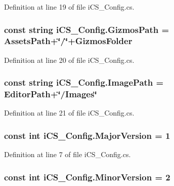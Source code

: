 Definition at line 19 of file i\+C\+S\+\_\+\+Config.\+cs.

\hypertarget{classi_c_s___config_a7deb8fdd0a9734848127198b9f6f071e}{
\subsubsection[{Gizmos\+Path}]{\setlength{\rightskip}{0pt plus 5cm}const string i\+C\+S\+\_\+\+Config.\+Gizmos\+Path = {\bf Assets\+Path}+\char`\"{}/\char`\"{}+{\bf Gizmos\+Folder}}}\label{classi_c_s___config_a7deb8fdd0a9734848127198b9f6f071e}


Definition at line 20 of file i\+C\+S\+\_\+\+Config.\+cs.

\hypertarget{classi_c_s___config_ae1a2253b034fcde9a0e4e9654c98a7f8}{
\subsubsection[{Image\+Path}]{\setlength{\rightskip}{0pt plus 5cm}const string i\+C\+S\+\_\+\+Config.\+Image\+Path = {\bf Editor\+Path}+\char`\"{}/Images\char`\"{}}}\label{classi_c_s___config_ae1a2253b034fcde9a0e4e9654c98a7f8}


Definition at line 21 of file i\+C\+S\+\_\+\+Config.\+cs.

\hypertarget{classi_c_s___config_aa9a3b07dafcb7149e62f529e3fc21a52}{
\subsubsection[{Major\+Version}]{\setlength{\rightskip}{0pt plus 5cm}const int i\+C\+S\+\_\+\+Config.\+Major\+Version = 1}}\label{classi_c_s___config_aa9a3b07dafcb7149e62f529e3fc21a52}


Definition at line 7 of file i\+C\+S\+\_\+\+Config.\+cs.

\hypertarget{classi_c_s___config_aa5aa40cbc25b7765e68683028cc5d023}{
\subsubsection[{Minor\+Version}]{\setlength{\rightskip}{0pt plus 5cm}const int i\+C\+S\+\_\+\+Config.\+Minor\+Version = 2}}\label{classi_c_s___config_aa5aa40cbc25b7765e68683028cc5d023}


